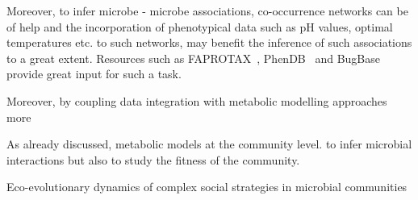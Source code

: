    Moreover, to infer microbe - microbe associations,
   co-occurrence networks can be of help 
   and the incorporation of phenotypical data 
   such as pH values, optimal temperatures etc. to such networks, may benefit 
   the inference of such associations to a great extent. 
   Resources such as FAPROTAX~\citep*{louca2016decoupling}, PhenDB~\citep{feldbauer2015prediction}
   and BugBase~\citep{Ward133462} provide great input for such a task. 

   Moreover, by coupling data integration with metabolic modelling approaches 
   more 



   As already discussed, metabolic models 
   at the community level. 
   to infer microbial interactions but also to study the fitness of the community. 


   Eco-evolutionary dynamics of complex social strategies in microbial communities~\citep{harrington2014eco}















